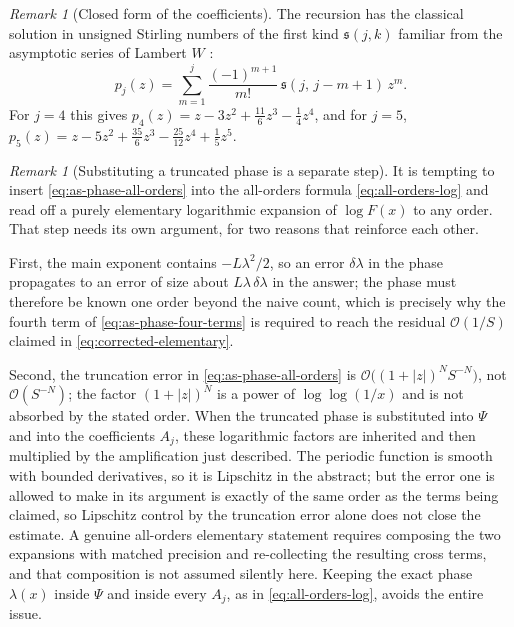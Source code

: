 \documentclass[11pt,oneside]{article}
\theoremstyle{definition}
\theoremstyle{remark}
\newtheorem{remark}[theorem]{Remark}
\newcommand{\bigO}{\mathcal O}
\begin{document}
\begin{remark}[Closed form of the coefficients]
\label{rem:as-stirling}
The recursion has the classical solution in unsigned Stirling numbers of the first kind
$\mathfrak s(j,k)$ familiar from the asymptotic series of Lambert $W$ \cite{corless1996}:
\begin{equation}
 p_j(z)=\sum_{m=1}^{j}\frac{(-1)^{m+1}}{m!}\,\mathfrak s(j,\,j-m+1)\,z^{m}.
                                                          \label{eq:as-stirling-form}
\end{equation}
For $j=4$ this gives $p_4(z)=z-3z^{2}+\tfrac{11}{6}z^{3}-\tfrac14z^{4}$, and for $j=5$,
$p_5(z)=z-5z^{2}+\tfrac{35}{6}z^{3}-\tfrac{25}{12}z^{4}+\tfrac15z^{5}$.
\end{remark}

\begin{remark}[Substituting a truncated phase is a separate step]
\label{rem:as-truncation-warning}
It is tempting to insert \eqref{eq:as-phase-all-orders} into the all-orders formula
\eqref{eq:all-orders-log} and read off a purely elementary logarithmic expansion of
$\log F(x)$ to any order.  That step needs its own argument, for two reasons that reinforce
each other.

First, the main exponent contains $-L\lambda^{2}/2$, so an error $\delta\lambda$ in the phase
propagates to an error of size about $L\lambda\,\delta\lambda$ in the answer; the phase must
therefore be known one order beyond the naive count, which is precisely why the fourth term of
\eqref{eq:as-phase-four-terms} is required to reach the residual $\bigO(1/S)$ claimed in
\eqref{eq:corrected-elementary}.

Second, the truncation error in \eqref{eq:as-phase-all-orders} is
$\bigO\bigl((1+|z|)^{N}S^{-N}\bigr)$, not $\bigO(S^{-N})$; the factor $(1+|z|)^{N}$ is a
power of $\log\log(1/x)$ and is not absorbed by the stated order.  When the truncated phase is
substituted into $\Psi$ and into the coefficients $A_j$, these logarithmic factors are
inherited and then multiplied by the amplification just described.  The periodic function is
smooth with bounded derivatives, so it is Lipschitz in the abstract; but the error one is
allowed to make in its argument is exactly of the same order as the terms being claimed, so
Lipschitz control by the truncation error alone does not close the estimate.  A genuine
all-orders elementary statement requires composing the two expansions with matched precision
and re-collecting the resulting cross terms, and that composition is not assumed silently
here.  Keeping the exact phase $\lambda(x)$ inside $\Psi$ and inside every $A_j$, as in
\eqref{eq:all-orders-log}, avoids the entire issue.
\end{remark}
\end{document}
